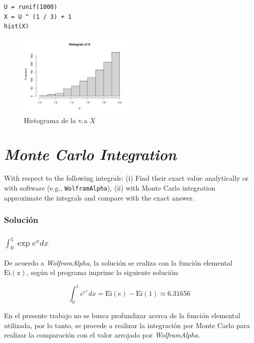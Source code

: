 \documentclass[12pt]{article}
\begin{document}
\begin{lstlisting}
U = runif(1000)
X = U ^ (1 / 3) + 1
hist(X)
\end{lstlisting}

\begin{figure}[ht]
  \centering
  \includegraphics[width=0.5\textwidth]{img/histograma.png}
  \caption{\label{fig:fig1} Histograma de la v.a $X$}
\end{figure}






\section{\textit{Monte Carlo Integration}}

With respect to the following integrals: (i) Find their exact value analytically or with software (e.g., \texttt{WolframAlpha}), (ii) with Monte Carlo integration approximate the integrals and compare with the exact answer.

\subsubsection{Solución}

\subsubsection{$\int_{0}^{1} \exp{e^{x}} dx$}

De acuerdo a \textit{WolframAlpha}, la solución se realiza con la función elemental $\mathrm{Ei(x)}$, según el programa imprime la siguiente solución:

\[
\int_{0}^{1} e^{e^{x}}dx = \mathrm{Ei}(e) - \mathrm{Ei}(1) \approx 6.31656
\]

En el presente trabajo no se busca profundizar acerca de la función elemental utilizada, por lo tanto, se procede a realizar la integración por Monte Carlo para realizar la comparación con el valor arrojado por \textit{WolframAlpha}.
\end{document}
